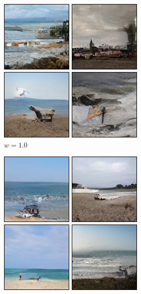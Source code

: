 \documentclass[11pt,a4paper]{article}
\begin{document}
\begin{figure}[!ht]
\centering
\begin{subfigure}[b]{0.24\textwidth}
\includegraphics[width=\linewidth]{figures/a_beach_1.png}
\caption{$w=1.0$}
\end{subfigure}
\begin{subfigure}[b]{0.24\textwidth}
\includegraphics[width=\linewidth]{figures/a_beach_3.png}

\end{subfigure}
\end{figure}
\end{document}
